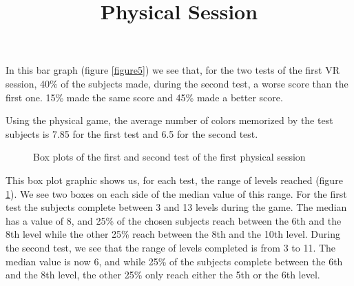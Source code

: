 \documentclass[12pt, openany, twocolumn]{article}
\begin{document}
            In this bar graph (figure \ref{figure5}) we see that, for the two tests of the first VR session, 40\% of the subjects made, during the second test, a worse score than the first one. 
            15\% made the same score and 45\% made a better score.
            \\

            \noindent \title{\textbf{Physical Session}} \vspace{0.25cm}

            Using the physical game, the average number of colors memorized by the test subjects is 7.85 for the first test and 6.5 for the second test.
          
                \begin{figure}[H]
                    \centering
                    \setlength{\fboxsep}{0pt}
                    \caption{Box plots of the first and second test of the first physical session}
                    \label{figure6}
                \end{figure}
        
            This box plot graphic shows us, for each test, the range of levels reached (figure \ref{figure6}).
            We see two boxes on each side of the median value of this range.
            For the first test the subjects complete between 3 and 13 levels during the game. 
            The median has a value of 8, and 25\% of the chosen subjects reach between the 6th and the 8th level while the other 25\% reach between the 8th and the 10th level. 
            During the second test, we see that the range of levels completed is from 3 to 11. 
            The median value is now 6, and while 25\% of the subjects complete between the 6th and the 8th level, the other 25\% only reach either the 5th or the 6th level.
            \\
\end{document}
